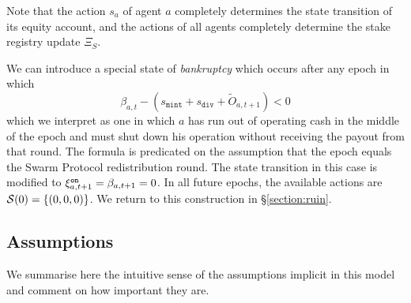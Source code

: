 Note that the action $s_a$ of agent $a$ completely determines the state transition of its equity account, and the actions of all agents completely determine the stake registry update $\Xi_S$.

\begin{remark}[Ruin]

  We can introduce a special state of \emph{bankruptcy} which occurs after any epoch in which 
  \[
    \beta_{a,t} - (s_\mathtt{mint} + s_\mathtt{div} + \tilde{O}_{a,t+1})<0
  \]
  which we interpret as one in which $a$ has run out of operating cash in the middle of the epoch and must shut down his operation without receiving the payout from that round.
  The formula is predicated on the assumption that the epoch equals the Swarm Protocol redistribution round.
  The state transition in this case is modified to $\xi^{\mathtt{on}}_{a,t+1} = \beta_{a,t+1}=0$.
  In all future epochs, the available actions are $\mathcal{S}(0)=\{(0,0,0)\}$.
  We return to this construction in \S\ref{section:ruin}.

\end{remark}




\subsection{Assumptions}
\label{section:assumptions}

We summarise here the intuitive sense of the assumptions implicit in this model and comment on how important they are.

